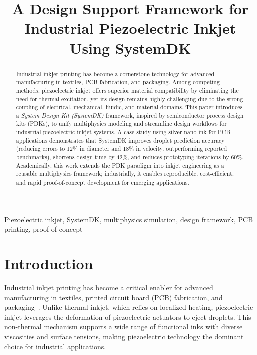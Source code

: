 \documentclass[conference]{IEEEtran}
\title{A Design Support Framework for Industrial Piezoelectric Inkjet Using SystemDK}
\author{%
  \IEEEauthorblockN{Shinichi Samizo}
  \IEEEauthorblockA{Independent Semiconductor Researcher\\
  Former Engineer at Seiko Epson Corporation\\
  Email: \href{mailto:shin3t72@gmail.com}{shin3t72@gmail.com}\\
  GitHub: \url{https://github.com/Samizo-AITL}}%
}
\begin{document}
\maketitle

\begin{abstract}
Industrial inkjet printing has become a cornerstone technology for advanced manufacturing in textiles, PCB fabrication, and packaging. 
Among competing methods, piezoelectric inkjet offers superior material compatibility by eliminating the need for thermal excitation, yet its design remains highly challenging due to the strong coupling of electrical, mechanical, fluidic, and material domains. 
This paper introduces a \emph{System Design Kit (SystemDK)} framework, inspired by semiconductor process design kits (PDKs), to unify multiphysics modeling and streamline design workflows for industrial piezoelectric inkjet systems. 
A case study using silver nano-ink for PCB applications demonstrates that SystemDK improves droplet prediction accuracy (reducing errors to 12\% in diameter and 18\% in velocity, outperforming reported benchmarks), shortens design time by 42\%, and reduces prototyping iterations by 60\%. 
Academically, this work extends the PDK paradigm into inkjet engineering as a reusable multiphysics framework; industrially, it enables reproducible, cost-efficient, and rapid proof-of-concept development for emerging applications.
\end{abstract}

\begin{IEEEkeywords}
Piezoelectric inkjet, SystemDK, multiphysics simulation, design framework, PCB printing, proof of concept
\end{IEEEkeywords}

\section{Introduction}
Industrial inkjet printing has become a critical enabler for advanced manufacturing in textiles, printed circuit board (PCB) fabrication, and packaging~\cite{derby2010,calvert2001}. 
Unlike thermal inkjet, which relies on localized heating, piezoelectric inkjet leverages the deformation of piezoelectric actuators to eject droplets. 
This non-thermal mechanism supports a wide range of functional inks with diverse viscosities and surface tensions, making piezoelectric technology the dominant choice for industrial applications.
\end{document}
